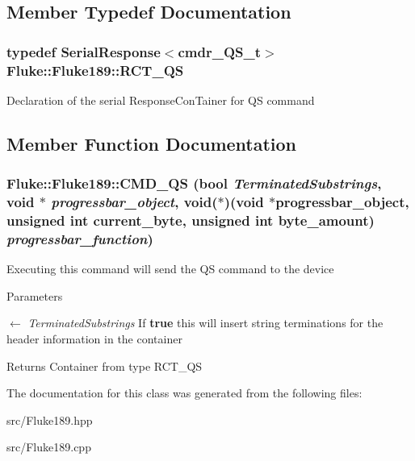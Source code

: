 \subsection{Member Typedef Documentation}
\hypertarget{classFluke_1_1Fluke189_a9fee860a536aaaa113af0248791e9fef}{
\subsubsection[{RCT\_\-QS}]{\setlength{\rightskip}{0pt plus 5cm}typedef SerialResponse$<${\bf cmdr\_\-QS\_\-t}$>$ {\bf Fluke::Fluke189::RCT\_\-QS}}}
\label{classFluke_1_1Fluke189_a9fee860a536aaaa113af0248791e9fef}
Declaration of the serial ResponseConTainer for QS command 

\subsection{Member Function Documentation}
\hypertarget{classFluke_1_1Fluke189_a5747ae5dbcc0d078566dd8ff28c3d6b5}{
\subsubsection[{CMD\_\-QS}]{ Fluke::Fluke189::CMD\_\-QS (bool {\em TerminatedSubstrings}, \/  void $\ast$ {\em progressbar\_\-object}, \/  void($\ast$)(void $\ast$progressbar\_\-object, unsigned int current\_\-byte, unsigned int byte\_\-amount) {\em progressbar\_\-function})}}
\label{classFluke_1_1Fluke189_a5747ae5dbcc0d078566dd8ff28c3d6b5}
Executing this command will send the QS command to the device


\begin{DoxyParams}{Parameters}
\item[\mbox{$\leftarrow$} {\em TerminatedSubstrings}]If {\bfseries true} this will insert string terminations for the header information in the container\end{DoxyParams}
\begin{DoxyReturn}{Returns}
Container from type RCT\_\-QS 
\end{DoxyReturn}


The documentation for this class was generated from the following files:\begin{DoxyCompactItemize}
\item 
src/Fluke189.hpp\item 
src/Fluke189.cpp\end{DoxyCompactItemize}
